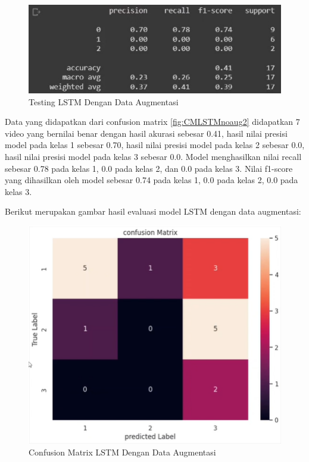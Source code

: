 \begin{figure} [H] \centering
  \includegraphics[scale=1]{gambar/scoreLSTMnoaug2.png}
  \caption{Testing LSTM Dengan Data Augmentasi}
  \label{fig:ScoreLSTMnoaug2}
\end{figure}
Data yang didapatkan dari confusion matrix \ref{fig:CMLSTMnoaug2} didapatkan 7 video yang bernilai benar
dengan hasil akurasi sebesar 0.41, hasil nilai presisi model pada kelas 1 sebesar 0.70, hasil nilai
presisi model pada kelas 2 sebesar 0.0, hasil nilai presisi model pada kelas 3 sebesar 0.0. Model menghasilkan
nilai recall sebesar 0.78 pada kelas 1, 0.0 pada kelas 2, dan 0.0 pada kelas 3. Nilai f1-score yang dihasilkan
oleh model sebesar 0.74 pada kelas 1, 0.0 pada kelas 2, 0.0 pada kelas 3.

Berikut merupakan gambar hasil evaluasi model LSTM dengan data augmentasi:
\begin{figure} [H] \centering
  \includegraphics[scale=1.3]{gambar/CMLSTMaug2.png}
  \caption{Confusion Matrix LSTM Dengan Data Augmentasi}
  \label{fig:CMLSTMaug2}
\end{figure}

